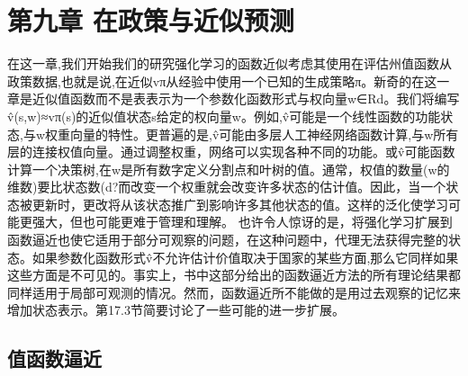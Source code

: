\chapter{第九章 在政策与近似预测}
\begin{summary}
	在这一章,我们开始我们的研究强化学习的函数近似考虑其使用在评估州值函数从政策数据,也就是说,在近似vπ从经验中使用一个已知的生成策略π。新奇的在这一章是近似值函数而不是表表示为一个参数化函数形式与权向量w∈Rd。我们将编写v̂(s,w)≈vπ(s)的近似值状态s给定的权向量w。例如,v̂可能是一个线性函数的功能状态,与w权重向量的特性。更普遍的是,v̂可能由多层人工神经网络函数计算,与w所有层的连接权值向量。通过调整权重，网络可以实现各种不同的功能。或v̂可能函数计算一个决策树,在w是所有数字定义分割点和叶树的值。通常，权值的数量(w的维数)要比状态数(d?而改变一个权重就会改变许多状态的估计值。因此，当一个状态被更新时，更改将从该状态推广到影响许多其他状态的值。这样的泛化使学习可能更强大，但也可能更难于管理和理解。
	也许令人惊讶的是，将强化学习扩展到函数逼近也使它适用于部分可观察的问题，在这种问题中，代理无法获得完整的状态。如果参数化函数形式v̂不允许估计价值取决于国家的某些方面,那么它同样如果这些方面是不可见的。事实上，书中这部分给出的函数逼近方法的所有理论结果都同样适用于局部可观测的情况。然而，函数逼近所不能做的是用过去观察的记忆来增加状态表示。第17.3节简要讨论了一些可能的进一步扩展。
\end{summary}

\section{值函数逼近}

